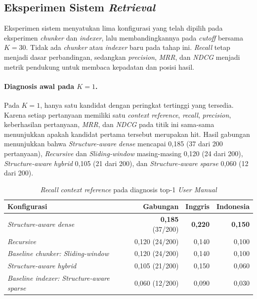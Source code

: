 \subsection{Eksperimen Sistem \emph{Retrieval}}
\label{subsec:user-manual-system-retrieval}

Eksperimen sistem menyatukan lima konfigurasi yang telah dipilih pada eksperimen \emph{chunker} dan
\emph{indexer}, lalu membandingkannya pada \emph{cutoff} bersama \(K = 30\). Tidak ada \emph{chunker} atau \emph{indexer}
baru pada tahap ini. \emph{Recall} tetap menjadi dasar perbandingan, sedangkan \emph{precision}, \emph{MRR}, dan \emph{NDCG}
menjadi metrik pendukung untuk membaca kepadatan dan posisi hasil.

\paragraph{Diagnosis awal pada \(K = 1\).}
Pada \(K = 1\), hanya satu kandidat dengan peringkat tertinggi yang tersedia. Karena setiap
pertanyaan memiliki satu \emph{context reference}, \emph{recall}, \emph{precision}, keberhasilan pertanyaan,
\emph{MRR}, dan \emph{NDCG} pada titik ini sama-sama menunjukkan apakah kandidat pertama tersebut merupakan
hit. Hasil gabungan menunjukkan bahwa \emph{Structure-aware} \emph{dense} mencapai 0,185 (37 dari 200
pertanyaan), \emph{Recursive} dan \emph{Sliding-window} masing-masing 0,120 (24 dari 200), \emph{Structure-aware}
\emph{hybrid} 0,105 (21 dari 200), dan \emph{Structure-aware} \emph{sparse} 0,060 (12 dari 200).

\begin{table}[H]
\centering
\scriptsize
\caption{\emph{Recall} \emph{context reference} pada diagnosis top-1 \emph{User Manual}}
\label{tab:customer-k1-diagnostic}
\begin{tabularx}{\textwidth}{@{}>{\RaggedRight\arraybackslash}Xrrr@{}}
\toprule
\textbf{Konfigurasi} & \textbf{Gabungan} & \textbf{Inggris} & \textbf{Indonesia}\\
\midrule
\emph{Structure-aware dense} & \textbf{0,185} (37/200) & \textbf{0,220} & \textbf{0,150}\\
\emph{Recursive} & 0,120 (24/200) & 0,140 & 0,100\\
\emph{Baseline chunker: Sliding-window} & 0,120 (24/200) & 0,140 & 0,100\\
\emph{Structure-aware hybrid} & 0,105 (21/200) & 0,150 & 0,060\\
\emph{Baseline indexer: Structure-aware sparse} & 0,060 (12/200) & 0,090 & 0,030\\
\bottomrule
\end{tabularx}
\end{table}

